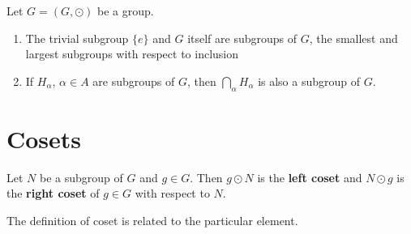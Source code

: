 \begin{eg} Let \(G = \left(G, \odot\right)\) be a group.
	\begin{enumerate}[label=(\alph*)]
		\item The trivial subgroup \(\{e\}\) and \(G\) itself are subgroups of \(G\), the smallest and
		largest subgroups with respect to inclusion
		\item If \(H_\alpha\), \(\alpha \in A\) are subgroups of \(G\), then \(\bigcap_\alpha H_\alpha\)
		is also a subgroup of \(G\). 
	\end{enumerate}
\end{eg}

\section{Cosets}
\begin{definition}[Coset]\label{def:coset}
	Let \(N\) be a subgroup of \(G\) and \(g \in G\). Then \(g \odot N\) is the \textbf{left coset}
	and \(N \odot g\) is the \textbf{right coset} of \(g \in G\) with respect to \(N\).
\end{definition}

\begin{remark}
	The definition of coset is related to the particular element.
\end{remark}

